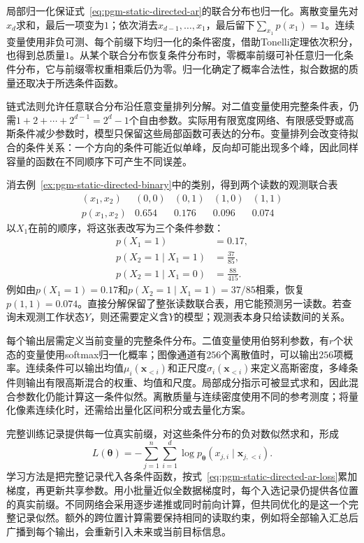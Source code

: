 局部归一化保证式~\eqref{eq:pgm-static-directed-ar}的联合分布也归一化。离散变量先对$x_d$求和，最后一项变为$1$；依次消去$x_{d-1},\ldots,x_1$，最后留下$\sum_{x_1}p(x_1)=1$。连续变量使用非负可测、每个前缀下均归一化的条件密度，借助Tonelli定理依次积分，也得到总质量$1$。从某个联合分布恢复条件分布时，零概率前缀可补任意归一化条件分布，它与前缀零权重相乘后仍为零。归一化确定了概率合法性，拟合数据的质量还取决于所选条件函数。

链式法则允许任意联合分布沿任意变量排列分解。对二值变量使用完整条件表，仍需$1+2+\cdots+2^{d-1}=2^d-1$个自由参数。实际用有限宽度网络、有限感受野或高斯条件减少参数时，模型只保留这些局部函数可表达的分布。变量排列会改变待拟合的条件关系：一个方向的条件可能近似单峰，反向却可能出现多个峰，因此同样容量的函数在不同顺序下可产生不同误差。

消去例~\ref{ex:pgm-static-directed-binary}中的类别，得到两个读数的观测联合表
\[
  \begin{array}{ccccc}
    (x_1,x_2)&(0,0)&(0,1)&(1,0)&(1,1)\\
    p(x_1,x_2)&0.654&0.176&0.096&0.074
  \end{array}
\]
以$X_1$在前的顺序，将这张表改写为三个条件参数：
\[
  \begin{aligned}
    p(X_1=1)&=0.17,\\
    p(X_2=1\mid X_1=1)&=\frac{37}{85},\\
    p(X_2=1\mid X_1=0)&=\frac{88}{415}.
  \end{aligned}
\]
例如由$p(X_1=1)=0.17$和$p(X_2=1\mid X_1=1)=37/85$相乘，恢复$p(1,1)=0.074$。直接分解保留了整张读数联合表，用它能预测另一读数。若查询未观测工作状态$Y$，则还需要定义含$Y$的模型；观测表本身只给读数间的关系。

每个输出层需定义当前变量的完整条件分布。二值变量使用伯努利参数，有$r$个状态的变量使用softmax归一化概率；图像通道有$256$个离散值时，可以输出$256$项概率。连续条件可以输出均值$\mu_i(\bm x_{<i})$和正尺度$\sigma_i(\bm x_{<i})$来定义高斯密度，多峰条件则输出有限高斯混合的权重、均值和尺度。局部成分指示可被显式求和，因此混合参数化仍能计算这一条件似然。离散质量与连续密度使用不同的参考测度；将量化像素连续化时，还需给出量化区间积分或去量化方案。

完整训练记录提供每一位真实前缀，对这些条件分布的负对数似然求和，形成
\begin{equation}
  \label{eq:pgm-static-directed-ar-loss}
  L(\bm{\theta})=-\sum_{j=1}^{n}\sum_{i=1}^{d}
      \log p_{\bm{\theta}}
      (x_{j,i}\mid\bm{x}_{j,<i}).
\end{equation}
学习方法是把完整记录代入各条件函数，按式~\eqref{eq:pgm-static-directed-ar-loss}累加梯度，再更新共享参数。用小批量近似全数据梯度时，每个入选记录仍提供各位置的真实前缀。不同网络会采用逐步递推或同时前向计算，但共同优化的是这一个完整记录似然。额外的跨位置计算需要保持相同的读取约束，例如将全部输入汇总后广播到每个输出，会重新引入未来或当前目标信息。


